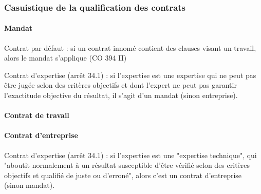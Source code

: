 \subsubsection{Casuistique de la qualification des contrats}

\paragraph{Mandat}
Contrat par défaut : si un contrat innomé contient des clauses visant un travail, alors le mandat s'applique (CO 394 II)

Contrat d'expertise (arrêt 34.1) : si l'expertise est une expertise qui ne peut pas être jugée selon des critères objectifs et dont l’expert ne peut pas garantir l’exactitude objective du résultat, il s'agit d'un mandat (sinon entreprise).

\paragraph{Contrat de travail}

\paragraph{Contrat d'entreprise}
Contrat d'expertise (arrêt 34.1) : si l'expertise est une "expertise technique", qui "aboutit normalement à un résultat susceptible d’être vérifié selon des critères objectifs et qualifié de juste ou d’erroné", alors c'est un contrat d'entreprise (sinon mandat).
